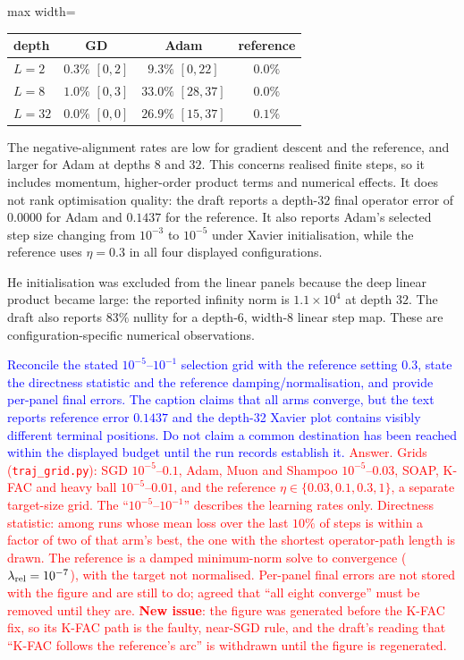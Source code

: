 \documentclass{article}
\newcommand{\zied}[1]{\textcolor{blue}{#1}}
\newcommand{\nat}[1]{\textcolor{red}{#1}}
\theoremstyle{definition}
\theoremstyle{remark}
\begin{document}
\begin{center}\small
\begin{adjustbox}{max width=\linewidth}
\begin{tabular}{lccc}
\toprule
depth & GD & Adam & reference \\
\midrule
$L=2$  & $0.3\%$ $[0,2]$ & $9.3\%$ $[0,22]$  & $0.0\%$ \\
$L=8$  & $1.0\%$ $[0,3]$ & $33.0\%$ $[28,37]$ & $0.0\%$ \\
$L=32$ & $0.0\%$ $[0,0]$ & $26.9\%$ $[15,37]$ & $0.1\%$ \\
\bottomrule
\end{tabular}
\end{adjustbox}
\end{center}

The negative-alignment rates are low for gradient descent and the reference, and larger for Adam at depths $8$ and $32$. This concerns realised finite steps, so it includes momentum, higher-order product terms and numerical effects. It does not rank optimisation quality: the draft reports a depth-$32$ final operator error of $0.0000$ for Adam and $0.1437$ for the reference. It also reports Adam's selected step size changing from $10^{-3}$ to $10^{-5}$ under Xavier initialisation, while the reference uses $\eta=0.3$ in all four displayed configurations.

He initialisation was excluded from the linear panels because the deep linear product became large: the reported infinity norm is $1.1\times10^4$ at depth $32$. The draft also reports $83\%$ nullity for a depth-$6$, width-$8$ linear step map. These are configuration-specific numerical observations.

\zied{Reconcile the stated $10^{-5}$--$10^{-1}$ selection grid with the reference setting $0.3$, state the directness statistic and the reference damping/normalisation, and provide per-panel final errors. The caption claims that all arms converge, but the text reports reference error $0.1437$ and the depth-32 Xavier plot contains visibly different terminal positions. Do not claim a common destination has been reached within the displayed budget until the run records establish it.}
\nat{Answer. Grids (\texttt{traj\_grid.py}): SGD $10^{-5}$--$0.1$, Adam, Muon and Shampoo $10^{-5}$--$0.03$, SOAP, K-FAC and heavy ball $10^{-5}$--$0.01$, and the reference $\eta\in\{0.03,0.1,0.3,1\}$, a separate target-size grid. The ``$10^{-5}$--$10^{-1}$'' describes the learning rates only. Directness statistic: among runs whose mean loss over the last $10\%$ of steps is within a factor of two of that arm's best, the one with the shortest operator-path length is drawn. The reference is a damped minimum-norm solve to convergence ($\lambda_{\rm rel}=10^{-7}$), with the target not normalised. Per-panel final errors are not stored with the figure and are still to do; agreed that ``all eight converge'' must be removed until they are. \textbf{New issue}: the figure was generated before the K-FAC fix, so its K-FAC path is the faulty, near-SGD rule, and the draft's reading that ``K-FAC follows the reference's arc'' is withdrawn until the figure is regenerated.}
\end{document}

